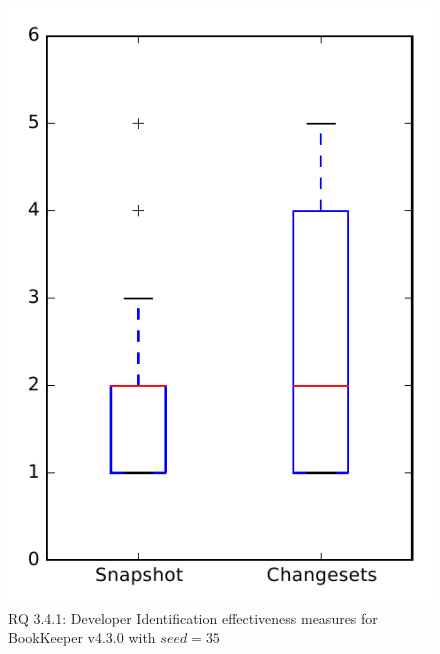 
\begin{figure}
\centering
\includegraphics[height=0.4\textheight]{figures/dit_seed/rq1_bookkeeper_35}
\caption{RQ 3.4.1: Developer Identification effectiveness measures for BookKeeper v4.3.0 with $seed=35$}
\label{fig:dit_seed:rq1:bookkeeper}
\end{figure}
